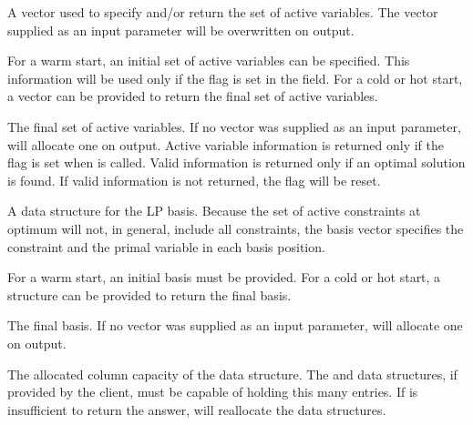 \begin{codedoc}
  \item{}
  A vector used to specify and/or return the set of active variables.
  The vector supplied as an input parameter will be overwritten on output.
  \begin{description}[\textbf{(o)}]
    \item[\textbf{(i)}]
    For a warm start, an initial set of active variables can be specified.
    This information will be used only if the  flag
    is set in the  field.
    For a cold or hot start, a vector can be provided to return the
    final set of active variables.

    \item[\textbf{(o)}]
    The final set of active variables.
    If no vector was supplied as an input parameter, \dylp will allocate
    one on output.
    Active variable information is returned only if the 
    flag is set when \dylp is called.
    Valid information is returned only if an optimal solution is found.
    If valid information is not returned, the  flag
    will be reset.
  \end{description}

  \item{}
  A data structure for the LP basis.
  Because the set of active constraints at optimum will not, in general,
  include all constraints, the basis vector specifies the constraint and
  the primal variable in each basis position.
  \begin{description}[\textbf{(o)}]
    \item[\textbf{(i)}]
    For a warm start, an initial basis must be provided.
    For a cold or hot start, a structure can be provided to return the
    final basis.

    \item[\textbf{(o)}]
    The final basis.
    If no vector was supplied as an input parameter, \dylp will allocate
    one on output.
  \end{description}

  \item{}
  The allocated column capacity of the data structure.
  The  and  data structures,
  if provided by the client, must be capable of holding this many entries.
  If  is insufficient to return the answer, \dylp will
  reallocate the data structures.


\end{codedoc}
